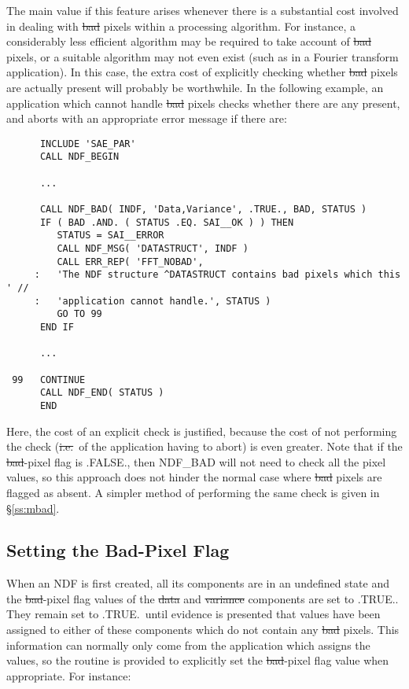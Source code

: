 The main value if this feature arises whenever there is a substantial cost
involved in dealing with \st{bad\/} pixels within a processing algorithm. 
For instance, a considerably less efficient algorithm may be required to
take account of \st{bad\/} pixels, or a suitable algorithm may not even exist
(such as in a Fourier transform application).
In this case, the extra cost of explicitly checking whether \st{bad\/} pixels
are actually present will probably be worthwhile.
In the following example, an application which cannot handle \st{bad\/} 
pixels checks whether there are any present, and aborts with an appropriate 
error message if there are:

\small
\begin{verbatim}
      INCLUDE 'SAE_PAR'
      CALL NDF_BEGIN

      ...

      CALL NDF_BAD( INDF, 'Data,Variance', .TRUE., BAD, STATUS )
      IF ( BAD .AND. ( STATUS .EQ. SAI__OK ) ) THEN
         STATUS = SAI__ERROR
         CALL NDF_MSG( 'DATASTRUCT', INDF )
         CALL ERR_REP( 'FFT_NOBAD',
     :   'The NDF structure ^DATASTRUCT contains bad pixels which this ' //
     :   'application cannot handle.', STATUS )
         GO TO 99
      END IF

      ...

 99   CONTINUE
      CALL NDF_END( STATUS )
      END
\end{verbatim}
\normalsize

Here, the cost of an explicit check is justified, because the cost of not
performing the check (\st{i.e.}\ of the application having to abort) is even
greater. 
Note that if the \st{bad\/}-pixel flag is .FALSE., then NDF\_BAD will not
need to check all the pixel values, so this approach does not hinder the
normal case where \st{bad\/} pixels are flagged as absent. 
A simpler method of performing the same check is given in \S\ref{ss:mbad}. 

\subsection{\label{ss:settingbadpixflag}Setting the Bad-Pixel Flag}

When an NDF is first created, all its components are in an undefined state and
the \st{bad\/}-pixel flag values of the \st{data\/} and \st{variance\/} components
are set to .TRUE.. 
They remain set to .TRUE.\ until evidence is presented that values have been
assigned to either of these components which do not contain any \st{bad\/}
pixels. 
This information can normally only come from the application which assigns the
values, so the routine  is provided to explicitly set the \st{bad\/}-pixel flag value when appropriate. 
For instance:


